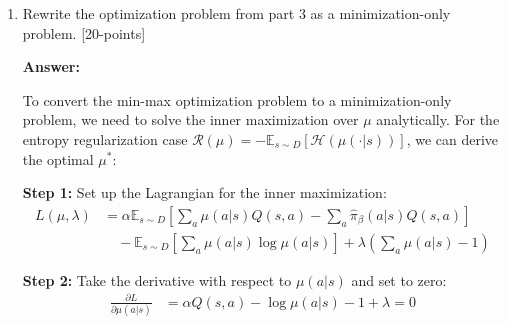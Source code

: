 \documentclass[12pt]{article}
\begin{document}
{{\begin{enumerate}
\begin{enumerate}
        \item \textbf{Fourth term:} $\mathbb{E}_{(s,a,s') \sim D} \left[ (Q(s,a) - (r(s,a) + \mathbb{E}[Q(s',a')]))^2 \right]$
        \begin{itemize}
            \item This is the \textbf{standard Bellman error} term that ensures Q-values satisfy the Bellman equation
            \item It enforces consistency with the environment dynamics and rewards
            \item This term ensures that the learned Q-function accurately represents the true value function for in-distribution data
            \item It provides the foundation for learning correct Q-values before applying conservative regularization
        \end{itemize}
    \end{enumerate}
    
    \textbf{Overall Mechanism:} The CQL objective learns Q-values that are conservative (low for OOD actions) but accurate (correct for in-distribution actions). The first two terms create a gap between Q-values for dataset actions and potentially OOD actions, while the entropy term ensures broad coverage, and the Bellman term maintains accuracy.

    \item Rewrite the optimization problem from part 3 as a minimization-only problem. [20-points]
    
    \textbf{Answer:}
    
    To convert the min-max optimization problem to a minimization-only problem, we need to solve the inner maximization over $\mu$ analytically. For the entropy regularization case $\mathcal{R}(\mu) = -\mathbb{E}_{s \sim D} [\mathcal{H}(\mu(\cdot|s))]$, we can derive the optimal $\mu^*$:
    
    \textbf{Step 1:} Set up the Lagrangian for the inner maximization:
    \begin{align}
    L(\mu, \lambda) &= \alpha \mathbb{E}_{s \sim D} \left[ \sum_a \mu(a|s) Q(s,a) - \sum_a \hat{\pi}_{\beta}(a|s) Q(s,a) \right] \\
    &\quad - \mathbb{E}_{s \sim D} \left[ \sum_a \mu(a|s) \log \mu(a|s) \right] + \lambda \left( \sum_a \mu(a|s) - 1 \right)
    \end{align}
    
    \textbf{Step 2:} Take the derivative with respect to $\mu(a|s)$ and set to zero:
    \begin{align}
    \frac{\partial L}{\partial \mu(a|s)} &= \alpha Q(s,a) - \log \mu(a|s) - 1 + \lambda = 0
    \end{align}
    

\end{enumerate}}}
\end{document}
